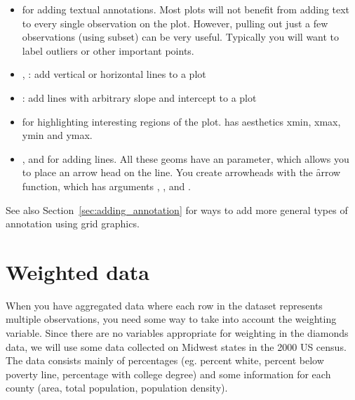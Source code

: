 \begin{itemize}
  \item {} for adding textual annotations.  Most plots will not benefit from adding text to every single observation on the plot.  However, pulling out just a few observations (using subset) can be very useful.  Typically you will want to label outliers or other important points.
  
  \item {}, : add vertical or horizontal lines to a plot
  
  \item {}: add lines with arbitrary slope and intercept to a plot
  
  \item {} for highlighting interesting regions of the plot.   has aesthetics xmin, xmax, ymin and ymax.
  
  \item {},  and  for adding lines.  All these geoms have an  parameter, which allows you to place an arrow head on the line.  You create arrowheads with the \f{arrow} function, which has arguments , ,  and .
  
\end{itemize}

See also Section~\ref{sec:adding_annotation} for ways to add more general types of annotation using grid graphics.

\section{Weighted data}
\label{sec:weighting}


When you have aggregated data where each row in the dataset represents multiple observations, you need some way to take into account the weighting variable.  Since there are no variables appropriate for weighting in the diamonds data, we will use some data collected on Midwest states in the 2000 US census.  The data consists mainly of percentages (eg. percent white, percent below poverty line, percentage with college degree) and some information for each county (area, total population, population density).

